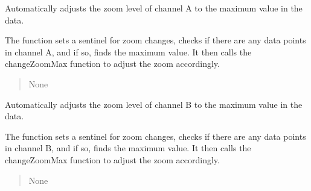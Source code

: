 \documentclass[letterpaper,10pt,english]{sphinxmanual}
\begin{document}
\begin{fulllineitems}
\begin{quote}
\begin{description}
\begin{itemize}
\end{itemize}

\end{description}\end{quote}

\begin{fulllineitems}
\label{\detokenize{StartStopHist:StartStopHist.StartStopLogic.autoRangeA}}
\pysigstartsignatures
{}
\pysigstopsignatures
\sphinxAtStartPar
Automatically adjusts the zoom level of channel A to the maximum value in the data.

\sphinxAtStartPar
The function sets a sentinel for zoom changes, checks if there are any data points in 
channel A, and if so, finds the maximum value. It then calls the changeZoomMax function
to adjust the zoom accordingly.
\begin{quote}\begin{description}
\sphinxAtStartPar
None

\end{description}\end{quote}

\end{fulllineitems}


\begin{fulllineitems}
\label{\detokenize{StartStopHist:StartStopHist.StartStopLogic.autoRangeB}}
\pysigstartsignatures
{}
\pysigstopsignatures
\sphinxAtStartPar
Automatically adjusts the zoom level of channel B to the maximum value in the data.

\sphinxAtStartPar
The function sets a sentinel for zoom changes, checks if there are any data points in 
channel B, and if so, finds the maximum value. It then calls the changeZoomMax function
to adjust the zoom accordingly.
\begin{quote}\begin{description}
\sphinxAtStartPar
None

\end{description}\end{quote}


\end{fulllineitems}
\end{fulllineitems}
\end{document}
